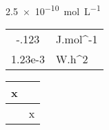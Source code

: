 \documentclass{article}
\begin{document}
\SI{2.5e-10}{mol.L^{-1}}


\vrule
\begin{tabular}{Ss}
  -.123 & J.mol^{-1} \\
  1.23e-3 & W.h^{2} \\
\end{tabular}%
\vrule

\vrule
\begin{tabular}{Ss}
   \\\hline
   x & \\\hline
   & x \\
\end{tabular}%
\vrule
\end{document}
